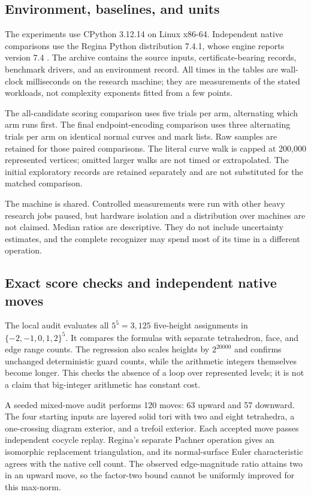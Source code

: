 


\subsection{Environment, baselines, and units}

The experiments use CPython 3.12.14 on Linux x86-64. Independent native
comparisons use the Regina Python distribution 7.4.1, whose engine reports
version 7.4 \cite{Regina}. The archive contains the source inputs,
certificate-bearing records, benchmark drivers, and an environment record.
All times in the tables are wall-clock milliseconds on the research
machine; they are measurements of the stated workloads, not complexity
exponents fitted from a few points.

The all-candidate scoring comparison uses five trials per arm, alternating
which arm runs first. The final endpoint-encoding comparison uses three
alternating trials per arm on identical normal curves and mark lists.
Raw samples are retained for those paired comparisons. The literal curve
walk is capped at 200,000 represented vertices; omitted larger walks are
not timed or extrapolated. The initial exploratory records are retained
separately and are not substituted for the matched comparison.

The machine is shared. Controlled measurements were run with other heavy
research jobs paused, but hardware isolation and a distribution over
machines are not claimed. Median ratios are descriptive. They do not
include uncertainty estimates, and the complete recognizer may spend most
of its time in a different operation.

\subsection{Exact score checks and independent native moves}

The local audit evaluates all $5^5=3,125$ five-height assignments in
$\{-2,-1,0,1,2\}^5$. It compares the formulas with separate tetrahedron,
face, and edge range counts. The regression also scales heights by
$2^{20000}$ and confirms unchanged deterministic guard counts, while the
arithmetic integers themselves become longer. This checks the absence
of a loop over represented levels; it is not a claim that big-integer
arithmetic has constant cost.

A seeded mixed-move audit performs 120 moves: 63 upward and 57 downward.
The four starting inputs are layered solid tori with two and eight
tetrahedra, a one-crossing diagram exterior, and a trefoil exterior.
Each accepted move passes independent cocycle replay. Regina's separate
Pachner operation gives an isomorphic replacement triangulation, and its
normal-surface Euler characteristic agrees with the native cell count.
The observed edge-magnitude ratio attains two in an upward move, so the
factor-two bound cannot be uniformly improved for this max-norm.

